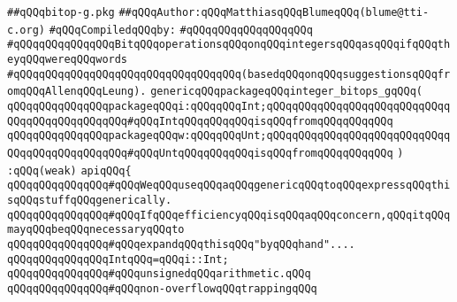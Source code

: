 \label{src/lib/c-glue-lib/ram/bitop-g.pkg}
\verb|##qQQqbitop-g.pkg|\newline
\verb|##qQQqAuthor:qQQqMatthiasqQQqBlumeqQQq(blume@tti-c.org)|\newline
\newline
\verb|#qQQqCompiledqQQqby:|\newline
\verb|#qQQqqQQqqQQqqQQqqQQq|\newline
\newline
\verb|#qQQqqQQqqQQqqQQqBitqQQqoperationsqQQqonqQQqintegersqQQqasqQQqifqQQqtheyqQQqwereqQQqwords|\newline
\verb|#qQQqqQQqqQQqqQQqqQQqqQQqqQQqqQQqqQQq(basedqQQqonqQQqsuggestionsqQQqfromqQQqAllenqQQqLeung).|\newline
\newline
\newline
\verb|genericqQQqpackageqQQqinteger_bitops_gqQQq(|\newline
\verb|qQQqqQQqqQQqqQQqpackageqQQqi:qQQqqQQqInt;qQQqqQQqqQQqqQQqqQQqqQQqqQQqqQQqqQQqqQQqqQQqqQQq#qQQqIntqQQqqQQqqQQqisqQQqfromqQQqqQQqqQQq|\newline
\verb|qQQqqQQqqQQqqQQqpackageqQQqw:qQQqqQQqUnt;qQQqqQQqqQQqqQQqqQQqqQQqqQQqqQQqqQQqqQQqqQQqqQQq#qQQqUntqQQqqQQqqQQqisqQQqfromqQQqqQQqqQQq|\newline
\verb|)|\newline
\verb|:qQQq(weak)|\newline
\verb|apiqQQq{|\newline
\newline
\verb|qQQqqQQqqQQqqQQq#qQQqWeqQQquseqQQqaqQQqgenericqQQqtoqQQqexpressqQQqthisqQQqstuffqQQqgenerically.|\newline
\verb|qQQqqQQqqQQqqQQq#qQQqIfqQQqefficiencyqQQqisqQQqaqQQqconcern,qQQqitqQQqmayqQQqbeqQQqnecessaryqQQqto|\newline
\verb|qQQqqQQqqQQqqQQq#qQQqexpandqQQqthisqQQq"byqQQqhand"....|\newline
\newline
\verb|qQQqqQQqqQQqqQQqIntqQQq=qQQqi::Int;|\newline
\newline
\verb|qQQqqQQqqQQqqQQq#qQQqunsignedqQQqarithmetic.qQQq|\newline
\verb|qQQqqQQqqQQqqQQq#qQQqnon-overflowqQQqtrappingqQQq|\newline
